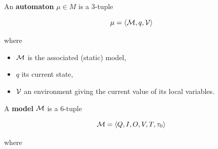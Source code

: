 \medskip\step
An \textbf{automaton} $\mu \in M$ is a 3-tuple 

\begin{equation*}
  \mu = \langle\mathcal{M}, q, \mathcal{V}\rangle
\end{equation*}

where
\begin{itemize}
\item $\mathcal{M}$ is the associated (static) model,
\item $q$ its current state,
\item $\mathcal{V}$ an environment giving the current value of its local variables.
\end{itemize}

\medskip\step
A \textbf{model} $\mathcal{M}$ is a 6-tuple

\begin{equation*}
  \mathcal{M} = \langle Q, I, O, V, T, \tau_0\rangle
\end{equation*}

where

